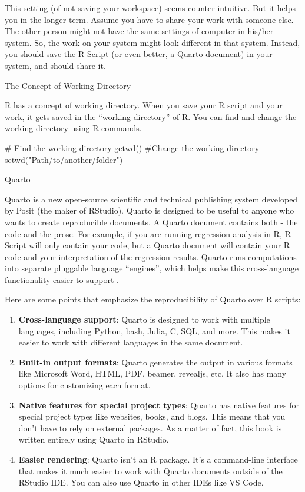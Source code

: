 \documentclass[
  letterpaper,
  twoside,
  openright,
  headsepline,
  footsepline,
  listof = totocnumbered,
  chapterprefix = true,
  titlepage = false]{scrbook}
\newenvironment{Shaded}{\begin{snugshade}}{\end{snugshade}}
\newcommand{\CommentTok}[1]{\textcolor[rgb]{0.37,0.37,0.37}{#1}}
\newcommand{\FunctionTok}[1]{\textcolor[rgb]{0.28,0.35,0.67}{#1}}
\newcommand{\NormalTok}[1]{\textcolor[rgb]{0.00,0.23,0.31}{#1}}
\newcommand{\StringTok}[1]{\textcolor[rgb]{0.13,0.47,0.30}{#1}}
\begin{document}
This setting (of not saving your workspace) seems counter-intuitive. But
it helps you in the longer term. Assume you have to share your work with
someone else. The other person might not have the same settings of
computer in his/her system. So, the work on your system might look
different in that system. Instead, you should save the R Script (or even
better, a Quarto document) in your system, and should share it.

The Concept of Working Directory

R has a concept of working directory. When you save your R script and
your work, it gets saved in the ``working directory'' of R. You can find
and change the working directory using R commands.

\begin{Shaded}
\begin{Highlighting}[numbers=left,,]
\CommentTok{\# Find the working directory}
\FunctionTok{getwd}\NormalTok{()}
\CommentTok{\#Change the working directory}
\FunctionTok{setwd}\NormalTok{(}\StringTok{"Path/to/another/folder"}\NormalTok{)}
\end{Highlighting}
\end{Shaded}

Quarto

Quarto is a new open-source scientific and technical publishing system
developed by Posit (the maker of RStudio). Quarto is designed to be
useful to anyone who wants to create reproducible documents. A Quarto
document contains both - the code and the prose. For example, if you are
running regression analysis in R, R Script will only contain your code,
but a Quarto document will contain your R code and your interpretation
of the regression results. Quarto runs computations into separate
pluggable language ``engines'', which helps make this cross-language
functionality easier to support .

Here are some points that emphasize the reproducibility of Quarto over R
scripts:

\begin{enumerate}
\def\labelenumi{\arabic{enumi}.}
\item
  \textbf{Cross-language support}: Quarto is designed to work with
  multiple languages, including Python, bash, Julia, C, SQL, and more.
  This makes it easier to work with different languages in the same
  document.
\item
  \textbf{Built-in output formats}: Quarto generates the output in
  various formats like Microsoft Word, HTML, PDF, beamer, revealjs, etc.
  It also has many options for customizing each format.
\item
  \textbf{Native features for special project types}: Quarto has native
  features for special project types like websites, books, and blogs.
  This means that you don't have to rely on external packages. As a
  matter of fact, this book is written entirely using Quarto in RStudio.
\item
  \textbf{Easier rendering}: Quarto isn't an R package. It's a
  command-line interface that makes it much easier to work with Quarto
  documents outside of the RStudio IDE. You can also use Quarto in other
  IDEs like VS Code.
\end{enumerate}
\end{document}
